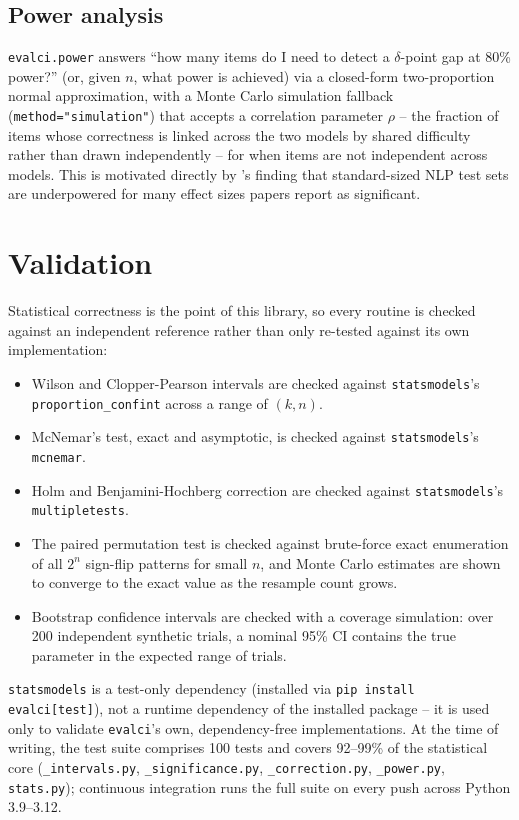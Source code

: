 \documentclass[11pt]{article}
\begin{document}
\subsection{Power analysis}
\texttt{evalci.power} answers ``how many items do I need to detect a
$\delta$-point gap at 80\% power?'' (or, given $n$, what power is achieved) via
a closed-form two-proportion normal approximation, with a Monte Carlo
simulation fallback (\texttt{method="simulation"}) that accepts a correlation
parameter $\rho$ -- the fraction of items whose correctness is linked across
the two models by shared difficulty rather than drawn independently -- for
when items are not independent across models. This is motivated directly by
\citet{card2020}'s finding that standard-sized NLP test sets are underpowered
for many effect sizes papers report as significant.

\section{Validation}
\label{sec:validation}

Statistical correctness is the point of this library, so every routine is
checked against an independent reference rather than only re-tested against
its own implementation:

\begin{itemize}
  \item Wilson and Clopper-Pearson intervals are checked against
  \texttt{statsmodels}'s \texttt{proportion\_confint}
  \citep{seabold2010statsmodels} across a range of $(k, n)$.
  \item McNemar's test, exact and asymptotic, is checked against
  \texttt{statsmodels}'s \texttt{mcnemar}.
  \item Holm and Benjamini-Hochberg correction are checked against
  \texttt{statsmodels}'s \texttt{multipletests}.
  \item The paired permutation test is checked against brute-force exact
  enumeration of all $2^n$ sign-flip patterns for small $n$, and Monte Carlo
  estimates are shown to converge to the exact value as the resample count
  grows.
  \item Bootstrap confidence intervals are checked with a coverage
  simulation: over 200 independent synthetic trials, a nominal 95\% CI
  contains the true parameter in the expected range of trials.
\end{itemize}

\texttt{statsmodels} is a test-only dependency (installed via
\texttt{pip install evalci[test]}), not a runtime dependency of the installed
package -- it is used only to validate \texttt{evalci}'s own,
dependency-free implementations. At the time of writing, the test suite
comprises 100 tests and covers 92--99\% of the statistical core
(\texttt{\_intervals.py}, \texttt{\_significance.py}, \texttt{\_correction.py},
\texttt{\_power.py}, \texttt{stats.py}); continuous integration runs the full
suite on every push across Python 3.9--3.12.
\end{document}
